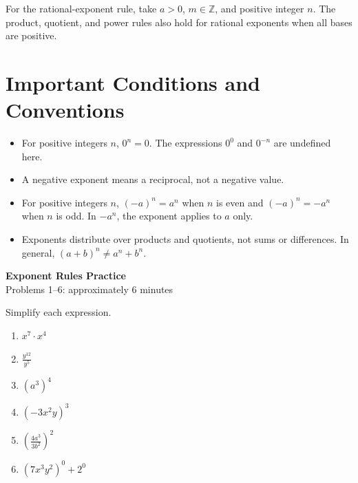 \documentclass[12pt]{article}
\begin{document}
For the rational-exponent rule, take $a>0$, $m\in\mathbb Z$, and positive
integer $n$. The product, quotient, and power rules also hold for rational
exponents when all bases are positive.

\section*{Important Conditions and Conventions}
\begin{itemize}[leftmargin=*,itemsep=0.35em]
  \item For positive integers $n$, $0^n=0$. The expressions $0^0$ and $0^{-n}$
  are undefined here.
  \item A negative exponent means a reciprocal, not a negative value.
  \item For positive integers $n$, $(-a)^n=a^n$ when $n$ is even and
  $(-a)^n=-a^n$ when $n$ is odd. In $-a^n$, the exponent applies to $a$ only.
  \item Exponents distribute over products and quotients, not sums or
  differences. In general, $(a+b)^n\ne a^n+b^n$.
\end{itemize}
\endgroup

\newpage
\begin{center}
  {\large\textbf{Exponent Rules Practice}}\\[2pt]
  Problems 1--6: approximately 6 minutes
\end{center}

Simplify each expression.
\begin{enumerate}[leftmargin=*,itemsep=0pt]
  \item $x^7\cdot x^4$

  \item $\displaystyle\frac{y^{12}}{y^5}$

  \item $(a^3)^4$

  \item $(-3x^2y)^3$

  \item $\displaystyle\left(\frac{4a^3}{3b^2}\right)^2$

  \item $(7x^3y^2)^0+2^0$
\end{enumerate}
\end{document}

